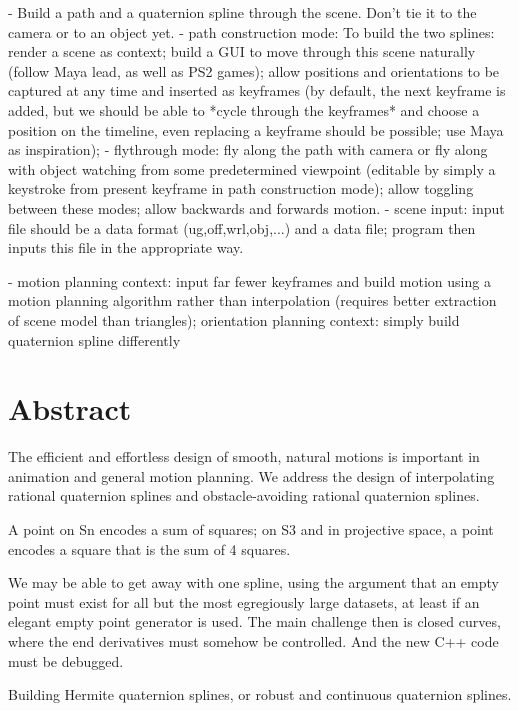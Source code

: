 \documentclass[12pt]{article}
\begin{document}
- Build a path and a quaternion spline through the scene.  Don't tie it to the camera
  or to an object yet.
- path construction mode:
  To build the two splines: render a scene as context; build a GUI to move through this
  scene naturally (follow Maya lead, as well as PS2 games); 
  allow positions and orientations to be captured at any time and
  inserted as keyframes (by default, the next keyframe is added, but we should be able to
  *cycle through the keyframes* and choose a position on the timeline, even replacing
  a keyframe should be possible; use Maya as inspiration);
- flythrough mode:
  fly along the path with camera or fly along with object watching from some predetermined
  viewpoint (editable by simply a keystroke from present keyframe in path construction 
  mode); allow toggling between these modes; allow backwards and forwards motion.
- scene input: input file should be a data format (ug,off,wrl,obj,...) and a data file;
  program then inputs this file in the appropriate way.

- motion planning context: input far fewer keyframes and build motion using
  a motion planning algorithm rather than interpolation (requires better extraction
  of scene model than triangles);
  orientation planning context: simply build quaternion spline differently

\clearpage

\section{Abstract}
The efficient and effortless design of smooth, natural motions is important
in animation and general motion planning.
We address the design of interpolating rational quaternion splines and 
obstacle-avoiding rational quaternion splines.

A point on Sn encodes a sum of squares; on S3 and in projective space,
a point encodes a square that is the sum of 4 squares.

We may be able to get away with one spline, using the argument that an empty point
must exist for all but the most egregiously large datasets, at least if an elegant
empty point generator is used.  The main challenge then is closed curves, where
the end derivatives must somehow be controlled.  And the new C++ code must be debugged.


Building Hermite quaternion splines, or
robust and continuous quaternion splines.
\end{document}
